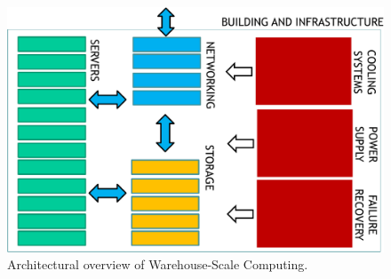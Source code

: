 \begin{figure}[!htp]
    \centering
    \includegraphics[width=\textwidth]{img/WSC-architecture-1.pdf}
    \caption{Architectural overview of Warehouse-Scale Computing.}
\end{figure}

\newpage

